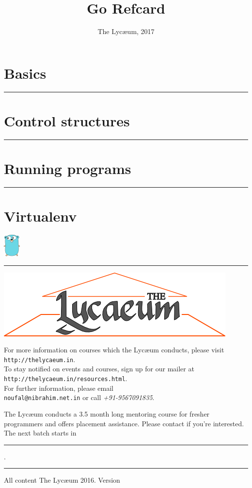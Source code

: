 \documentclass{../refsheet}
\title{Go Refcard}
\author{The Lyc\ae{}um, 2017}
\date{}
\begin{document}
\maketitle
\section{Basics}





\noindent\rule{\linewidth}{0.05ex}

\section{Control structures}
% 
% 
% 
% 
% 
% 

\noindent\rule{\linewidth}{0.05ex}
\section{Running programs}

\noindent\rule{\linewidth}{0.05ex}
\section{Virtualenv}
\includegraphics{../images/golang-small.png}

\noindent\rule{\linewidth}{0.05ex}
\begin{center}
\includegraphics[scale=0.4]{../images/parthenon-callig.png}
\end{center}
For more information on courses which the Lyc\ae{}um conducts, please
visit \texttt{http://thelycaeum.in}. \\To stay notified on events and
courses, sign up for our mailer at \texttt{http://thelycaeum.in/resources.html}. \\For further
information, please email \\\texttt{noufal@nibrahim.net.in} or call
\textit{+91-9567091835}.
\vspace{0.5cm}

The Lyc\ae{}um conducts a 3.5 month long mentoring course for fresher
programmers and offers placement assistance. Please contact if you're
interested. The next batch starts in \rule{4cm}{0.1ex}.

    \textcolor{lightgray}{\noindent\rule{\linewidth}{0.05ex}}
\footnotesize All content \textcopyright The Lyc\ae{}um 2016. Version 
\end{document}
